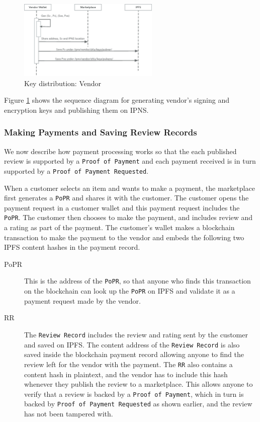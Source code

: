\documentclass[a4paper]{article}
\begin{document}
\begin{figure}
\centering
\includegraphics[width=0.6\textwidth]{../vendor-wallet-init.eps}
\caption{\label{fig:vendor-wallet-init}Key distribution: Vendor}
\end{figure}

Figure \ref{fig:vendor-wallet-init} shows the sequence diagram for
generating vendor's signing and encryption keys and publishing them on
IPNS.


\subsubsection{Making Payments and Saving Review Records}

We now describe how payment processing works so that the each
published review is supported by a \texttt{Proof of Payment} and each
payment received is in turn supported by a \texttt{Proof of Payment
  Requested}.

When a customer selects an item and wants to make a payment, the
marketplace first generates a \texttt{PoPR} and shares it with the
customer. The customer opens the payment request in a customer wallet
and this payment request includes the \texttt{PoPR}. The customer then
chooses to make the payment, and includes review and a rating as part
of the payment. The customer's wallet makes a blockchain transaction
to make the payment to the vendor and embeds the following two IPFS
content hashes in the payment record.

\begin{description}
\item[PoPR] This is the address of the \texttt{PoPR}, so that anyone who finds
  this transaction on the blockchain can look up the \texttt{PoPR} on
  IPFS and validate it as a payment request made by the vendor.
\item[RR] The \texttt{Review Record} includes the review and rating
  sent by the customer and saved on IPFS. The content address of the
  \texttt{Review Record} is also saved inside the blockchain payment
  record allowing anyone to find the review left for the vendor with
  the payment. The \texttt{RR} also contains a content hash in
  plaintext, and the vendor has to include this hash whenever they
  publish the review to a marketplace. This allows anyone to verify
  that a review is backed by a \texttt{Proof of Payment}, which in
  turn is backed by \texttt{Proof of Payment Requested} as shown
  earlier, and the review has not been tampered with.
\end{description}
\end{document}
